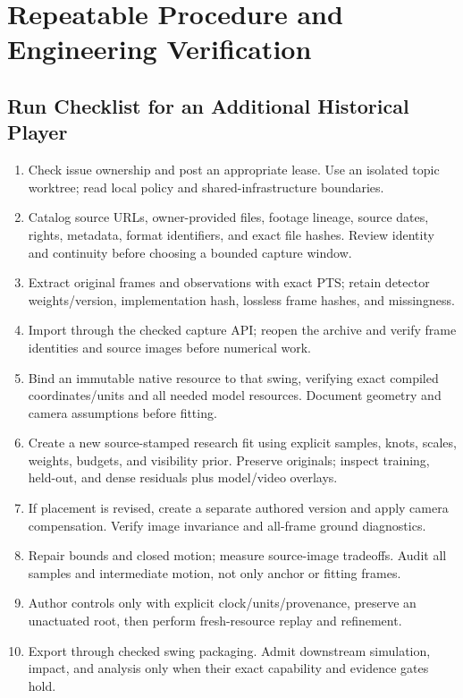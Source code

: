 \documentclass[11pt,letterpaper]{article}
\newcommand{\reportsection}[1]{\section{#1}}
\begin{document}
\reportsection{Repeatable Procedure and Engineering Verification}
\subsection{Run Checklist for an Additional Historical Player}
\begin{enumerate}
\item Check issue ownership and post an appropriate lease. Use an isolated
topic worktree; read local policy and shared-infrastructure boundaries.
\item Catalog source URLs, owner-provided files, footage lineage, source dates,
rights, metadata, format identifiers, and exact file hashes. Review identity
and continuity before choosing a bounded capture window.
\item Extract original frames and observations with exact PTS; retain detector
weights/version, implementation hash, lossless frame hashes, and missingness.
\item Import through the checked capture API; reopen the archive and verify
frame identities and source images before numerical work.
\item Bind an immutable native resource to that swing, verifying exact compiled
coordinates/units and all needed model resources. Document geometry and
camera assumptions before fitting.
\item Create a new source-stamped research fit using explicit samples, knots,
scales, weights, budgets, and visibility prior. Preserve originals; inspect
training, held-out, and dense residuals plus model/video overlays.
\item If placement is revised, create a separate authored version and apply
camera compensation. Verify image invariance and all-frame ground diagnostics.
\item Repair bounds and closed motion; measure source-image tradeoffs. Audit
all samples and intermediate motion, not only anchor or fitting frames.
\item Author controls only with explicit clock/units/provenance, preserve an
unactuated root, then perform fresh-resource replay and refinement.
\item Export through checked swing packaging. Admit downstream simulation,
impact, and analysis only when their exact capability and evidence gates hold.
\end{enumerate}
\end{document}
